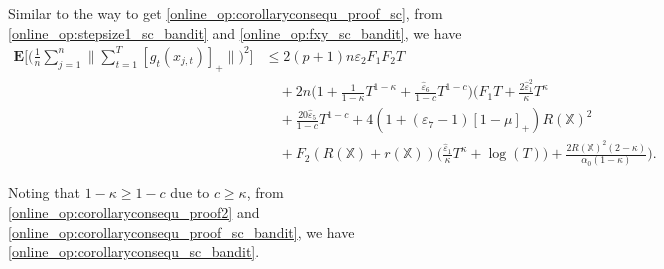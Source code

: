 \documentclass[12pt,draftcls,onecolumn]{IEEEtran}%
\begin{document}
 Similar to the way to get \eqref{online_op:corollaryconsequ_proof_sc}, from \eqref{online_op:stepsize1_sc_bandit}  and \eqref{online_op:fxy_sc_bandit}, we have
\begin{align}\label{online_op:corollaryconsequ_proof_sc_bandit}
\mathbf{E}\Big[\Big(\frac{1}{n}\sum_{j=1}^n\Big\|\sum_{t=1}^T[g_{t}(x_{j,t})]_+\Big\|\Big)^2\Big]
&\le 2(p+1)n\varepsilon_2F_1F_2T\nonumber\\
&\quad
+2n\Big(1+\frac{1}{1-\kappa}T^{1-\kappa}+\frac{\hat{\varepsilon}_6}{1-c}T^{1-c}\Big)
\Big(F_1T+\frac{2\hat{\varepsilon}^2_1}{\kappa}T^\kappa \nonumber\\
&\quad +\frac{20\hat{\varepsilon}_5}{1-c}T^{1-c}
+4(1+(\varepsilon_7-1)[1-\mu]_+)R(\mathbb{X})^2\nonumber\\
&\quad+F_2(R(\mathbb{X})+r(\mathbb{X}))\Big(\frac{\hat{\varepsilon}_1}{\kappa}
T^\kappa+\log(T)\Big)+\frac{2R(\mathbb{X})^2(2-\kappa)}{\alpha_0(1-\kappa)}\Big).
\end{align}

Noting that $1-\kappa\ge1-c$ due to $c\ge\kappa$, from  \eqref{online_op:corollaryconsequ_proof2} and \eqref{online_op:corollaryconsequ_proof_sc_bandit}, we have \eqref{online_op:corollaryconsequ_sc_bandit}.
\end{document}
